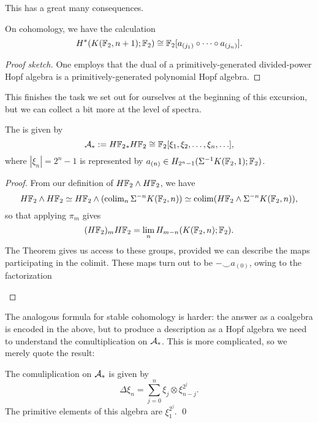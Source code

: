This has a great many consequences.

\begin{corollary}
On cohomology, we have the calculation \[H^*(K(\mathbb F_2, n+1); \mathbb F_2) \cong \mathbb F_2[a_{(j_1)} \circ \cdots \circ a_{(j_n)}].\]
\end{corollary}
\begin{proof}[Proof sketch]
One employs that the dual of a primitively-generated divided-power Hopf algebra is a primitively-generated polynomial Hopf algebra.
\end{proof}

\noindent
This finishes the task we set out for ourselves at the beginning of this excursion, but we can collect a bit more at the level of spectra.

\begin{corollary}
The  is given by \[\mathcal A_* := H\mathbb F_2{}_* H\mathbb F_2 \cong \mathbb F_2[\xi_1, \xi_2, \ldots, \xi_n, \ldots],\] where $|\xi_n| = 2^n - 1$ is represented by $a_{(n)} \in H_{2^n-1}(\Sigma^{-1} K(\mathbb F_2, 1); \mathbb F_2)$.
\end{corollary}
\begin{proof}
From our definition of $H\mathbb F_2 \wedge H\mathbb F_2$, we have \[H\mathbb F_2 \wedge H\mathbb F_2 \simeq H\mathbb F_2 \wedge (\operatorname{colim}_n \Sigma^{-n} K(\mathbb F_2, n)) \simeq \operatorname{colim} (H\mathbb F_2 \wedge \Sigma^{-n} K(\mathbb F_2, n)),\] so that applying $\pi_m$ gives \[(H\mathbb F_2)_m H\mathbb F_2 = \lim_n H_{m-n}(K(\mathbb F_2, n); \mathbb F_2).\]
The Theorem gives us access to these groups, provided we can describe the maps participating in the colimit.
These maps turn out to be $- \smile a_{(0)}$, owing to the factorization
\begin{center}
\end{center}
\end{proof}

The analogous formula for stable cohomology is harder: the answer as a coalgebra is encoded in the above, but to produce a description as a Hopf algebra we need to understand the comultiplication on $\mathcal A_*$.
This is more complicated, so we merely quote the result:
\begin{lemma}
The comuliplication on $\mathcal A_*$ is given by
\[\Delta \xi_n = \sum_{j=0}^n \xi_j \otimes \xi_{n-j}^{2^j}.\]
The primitive elements of this algebra are $\xi_1^{2^j}$.
\qed
\end{lemma}

